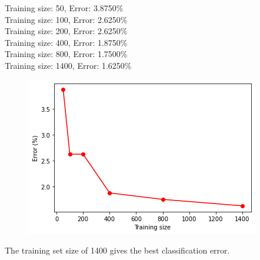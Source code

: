 \documentclass{article}
\begin{document}
Training size: 50, Error: 3.8750\% \\
Training size: 100, Error: 2.6250\% \\
Training size: 200, Error: 2.6250\% \\
Training size: 400, Error: 1.8750\% \\
Training size: 800, Error: 1.7500\% \\
Training size: 1400, Error: 1.6250\%

\begin{figure}[htbp]
    \centering
    \includegraphics[width=.6\textwidth]{q4.png}
\end{figure}
The training set size of 1400 gives the best classification error.
 
\end{document}
